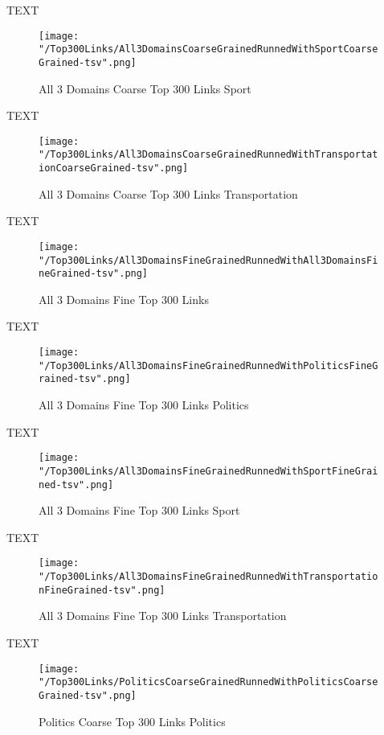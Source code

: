 \documentclass[thesis=M,english]{FITthesis}[2018/05/30]
\begin{document}
	TEXT	

	\begin{figure}\centering
		\texttt{[image: "/Top300Links/All3DomainsCoarseGrainedRunnedWithSportCoarseGrained-tsv".png]}
		\caption{All 3 Domains Coarse Top 300 Links Sport}\label{}
	\end{figure}
	
		TEXT	

	\begin{figure}\centering
		\texttt{[image: "/Top300Links/All3DomainsCoarseGrainedRunnedWithTransportationCoarseGrained-tsv".png]}
		\caption{All 3 Domains Coarse Top 300 Links Transportation}\label{}	
	\end{figure}
		
		TEXT	

	\begin{figure}\centering
		\texttt{[image: "/Top300Links/All3DomainsFineGrainedRunnedWithAll3DomainsFineGrained-tsv".png]}
		\caption{All 3 Domains Fine Top 300 Links }\label{}	
	\end{figure}
	
	TEXT

	\begin{figure}\centering
		\texttt{[image: "/Top300Links/All3DomainsFineGrainedRunnedWithPoliticsFineGrained-tsv".png]}
		\caption{All 3 Domains Fine Top 300 Links Politics}\label{}
	\end{figure}	

	TEXT	

	\begin{figure}\centering
		\texttt{[image: "/Top300Links/All3DomainsFineGrainedRunnedWithSportFineGrained-tsv".png]}
		\caption{All 3 Domains Fine Top 300 Links Sport}\label{}
	\end{figure}
	
		TEXT	

	\begin{figure}\centering
		\texttt{[image: "/Top300Links/All3DomainsFineGrainedRunnedWithTransportationFineGrained-tsv".png]}
		\caption{All 3 Domains Fine Top 300 Links Transportation}\label{}	
	\end{figure}
	
	TEXT

	\begin{figure}\centering
		\texttt{[image: "/Top300Links/PoliticsCoarseGrainedRunnedWithPoliticsCoarseGrained-tsv".png]}
		\caption{Politics Coarse Top 300 Links Politics}\label{}
	\end{figure}	
\end{document}
